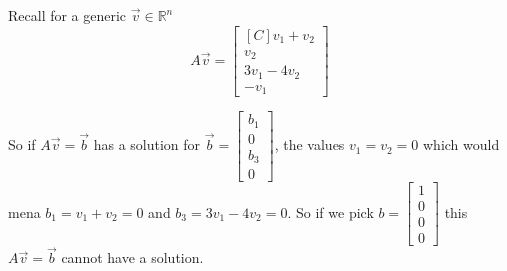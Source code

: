 \begin{example}
\begin{inparaenum}[a.)]
Recall for a generic $\vec{v} \in \mathbb{R}^n$
\[A\vec{v}=\begin{bmatrix*}[C]v_1+v_2\\v_2\\3v_1-4v_2\\-v_1\end{bmatrix*}\]

So if $A\vec{v}=\vec{b}$ has a solution for 
$\vec{b}=\begin{bmatrix*}b_1\\0\\b_3\\0\end{bmatrix*}$, the values $v_1=v_2=0$ 
which would mena $b_1=v_1+v_2=0$ and $b_3=3v_1-4v_2=0$. So if we pick
$b=\begin{bmatrix}1 \\ 0 \\ 0 \\ 0\end{bmatrix}$ this $A\vec{v}=\vec{b}$ 
cannot have a solution.
\end{inparaenum}
\end{example}


